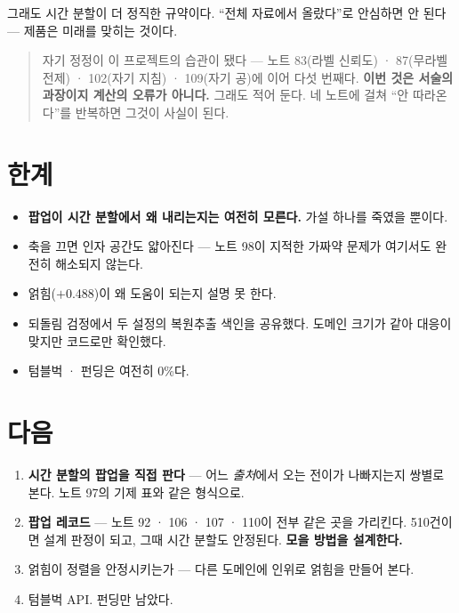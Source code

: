 \documentclass[10pt]{article}
\begin{document}
{그래도 시간 분할이 더 정직한 규약이다. ``전체 자료에서 올랐다''로 안심하면
안 된다 --- 제품은 미래를 맞히는 것이다.}

\begin{quote}\fontsize{9.5}{11.5}\selectfont
자기 정정이 이 프로젝트의 습관이 됐다 --- 노트 83(라벨 신뢰도) · 87(무라벨
전제) · 102(자기 지침) · 109(자기 공)에 이어 다섯 번째다. \textbf{이번 것은
서술의 과장이지 계산의 오류가 아니다.} 그래도 적어 둔다. 네 노트에 걸쳐
``안 따라온다''를 반복하면 그것이 사실이 된다.
\end{quote}

\section{한계}

\begin{itemize}[leftmargin=1.1em,itemsep=0.15em]
\item \textbf{팝업이 시간 분할에서 왜 내리는지는 여전히 모른다.} 가설 하나를
      죽였을 뿐이다.
\item 축을 끄면 인자 공간도 얇아진다 --- 노트 98이 지적한 가짜약 문제가
      여기서도 완전히 해소되지 않는다.
\item 얽힘($+$0.488)이 왜 도움이 되는지 설명 못 한다.
\item 되돌림 검정에서 두 설정의 복원추출 색인을 공유했다. 도메인 크기가 같아
      대응이 맞지만 코드로만 확인했다.
\item 텀블벅 · 펀딩은 여전히 0\%다.
\end{itemize}

\section{다음}

\begin{enumerate}[leftmargin=1.3em,itemsep=0.15em]
\item \textbf{시간 분할의 팝업을 직접 판다} --- 어느 \emph{출처}에서 오는
      전이가 나빠지는지 쌍별로 본다. 노트 97의 기제 표와 같은 형식으로.
\item \textbf{팝업 레코드} --- 노트 92 · 106 · 107 · 110이 전부 같은 곳을
      가리킨다. 510건이면 설계 판정이 되고, 그때 시간 분할도 안정된다.
      \textbf{모을 방법을 설계한다.}
\item 얽힘이 정렬을 안정시키는가 --- 다른 도메인에 인위로 얽힘을 만들어 본다.
\item 텀블벅 API. 펀딩만 남았다.
\end{enumerate}
\end{document}
